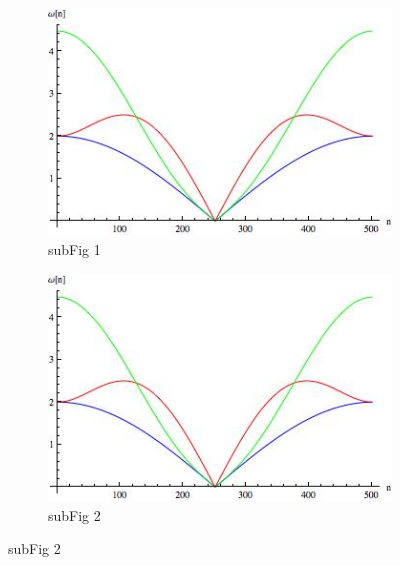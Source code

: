 \begin{figure}[ht]
	\centering
	\begin{subfigure}[h]{0.45\textwidth}
		\centering
		\includegraphics[height=0.7\linewidth,width=\linewidth]{chapter-2/fig/dispersion}
		\caption{subFig 1}
		
	\end{subfigure}
	\begin{subfigure}[h]{0.45\textwidth}
		\centering
		\includegraphics[height=0.7\linewidth,width=\linewidth]{chapter-2/fig/dispersion}
		\caption{subFig 2}
		

\end{subfigure}
\end{figure}
